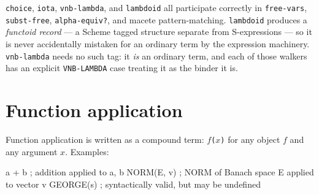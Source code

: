 \begin{remark}
\texttt{choice}, \texttt{iota}, \texttt{vnb-lambda}, and \texttt{lambdoid} all
participate correctly in \texttt{free-vars}, \texttt{subst-free},
\texttt{alpha-equiv?}, and macete pattern-matching.  \texttt{lambdoid} produces
a \emph{functoid record} --- a Scheme tagged structure separate from
S-expressions --- so it is never accidentally mistaken for an ordinary term by
the expression machinery.  \texttt{vnb-lambda} needs no such tag: it \emph{is}
an ordinary term, and each of those walkers has an explicit
\texttt{VNB-LAMBDA} case treating it as the binder it is.
\end{remark}

\section{Function application}
\label{sec:funapp}

Function application is written as a compound term: \texttt{$f$($x$)} for
any object $f$ and any argument $x$.  Examples:
\begin{VNBsnip}
a + b               ; addition applied to a, b
NORM(E, v)          ; NORM of Banach space E applied to vector v
GEORGE(s)           ; syntactically valid, but may be undefined
\end{VNBsnip}

